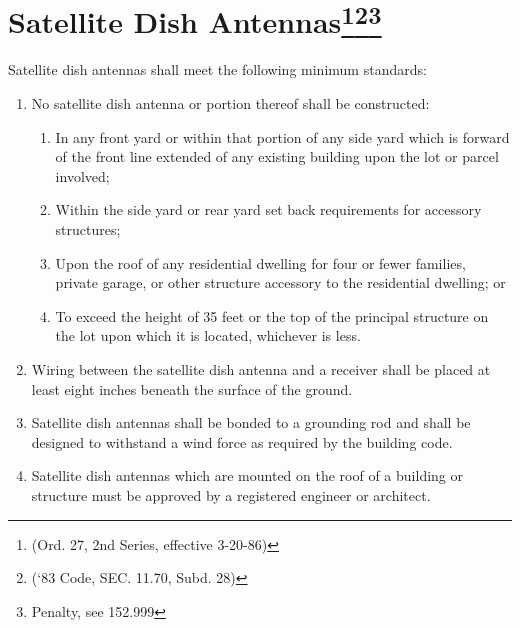 \section{Satellite Dish Antennas\footnote{(Ord. 27, 2nd Series, effective 3-20-86)}\footnote{(‘83 Code, SEC. 11.70, Subd. 28)}\footnote{Penalty, see 152.999}}
Satellite dish antennas shall meet the following minimum standards:
\begin{enumerate}[{\indent}A)]
    \item No satellite dish antenna or portion thereof shall be constructed:
        \begin{enumerate}
            \item In any front yard or within that portion of any side yard which is forward of the front line extended of any existing building upon the lot or parcel involved;
            \item Within the side yard or rear yard set back requirements for accessory structures; 
            \item Upon the roof of any residential dwelling for four or fewer families, private garage, or other structure accessory to the residential dwelling; or 
            \item To exceed the height of 35 feet or the top of the principal structure on the lot upon which it is located, whichever is less.
        \end{enumerate}
    \item Wiring between the satellite dish antenna and a receiver shall be placed at least eight inches beneath the surface of the ground.
    \item Satellite dish antennas shall be bonded to a grounding rod and shall be designed to withstand a wind force as required by the building code.
    \item Satellite dish antennas which are mounted on the roof of a building or structure must be approved by a registered engineer or architect.
\end{enumerate}

